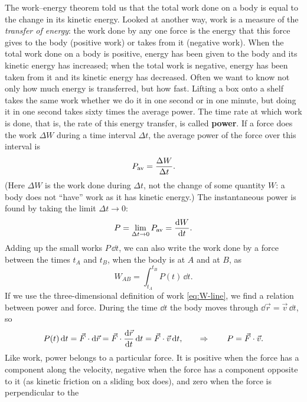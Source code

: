 \documentclass[11pt,a4paper]{article}
\begin{document}
The work--energy theorem told us that the total work done on a body is equal to the change in its
kinetic energy. Looked at another way, work is a measure of the \emph{transfer of energy}: the work
done by any one force is the energy that this force gives to the body (positive work) or takes from
it (negative work). When the total work done on a body is positive, energy has been given to the
body and its kinetic energy has increased; when the total work is negative, energy has been taken
from it and its kinetic energy has decreased. Often we want to know not only how much energy is transferred, but how fast. Lifting a box
onto a shelf takes the same work whether we do it in one second or in one minute, but doing it in
one second takes sixty times the average power. The time rate at which work is done, that is, the rate of this energy transfer, is called
\textbf{power}. If a force does the work $\Delta W$ during a time interval $\Delta t$, the average power
of the force over this interval is
\begin{equation}\label{eq:P-avg}
  P_{\mathrm{av}} = \frac{\Delta W}{\Delta t} .
\end{equation}
(Here $\Delta W$ is the work done during $\Delta t$, not the change of some quantity $W$: a body
does not ``have'' work as it has kinetic energy.) The instantaneous power is found by
taking the limit $\Delta t \to 0$:
\begin{equation}\label{eq:P-inst}
  P = \lim_{\Delta t \to 0} P_{\mathrm{av}} = \frac{\mathrm{d} W}{\mathrm{d} t} .
\end{equation}
Adding up the small works $P\,\dd t$, we can also write the work done by a force between the
times $t_A$ and $t_B$, when the body is at $A$ and at $B$, as
\begin{equation}\label{eq:W-from-P}
  W_{AB} = \int_{t_A}^{t_B} P(t)\,\dd t .
\end{equation}
If we use the three-dimensional definition of work \eqref{eq:W-line}, we find a relation between power
and force. During the time $\dd t$ the body moves through $\dd\vec{r} = \vec{v}\,\dd t$, so
\begin{equation}\label{eq:P-Fv}
  P(t)\,\mathrm{d} t = \vec{F}\cdot\mathrm{d}\vec{r} = \vec{F}\cdot\frac{\mathrm{d} \vec{r}}{\mathrm{d} t}\,\mathrm{d} t = \vec{F}\cdot\vec{v}\,\mathrm{d} t ,
  \qquad\Rightarrow\qquad P = \vec{F}\cdot\vec{v} .
\end{equation}
Like work, power belongs to a particular force. It is positive when the force has a component along
the velocity, negative when the force has a component opposite to it (as kinetic friction on a sliding box
does), and zero when the force is perpendicular to the
\end{document}

